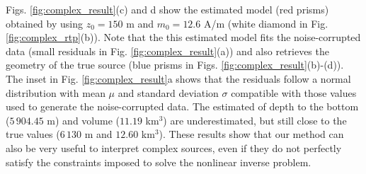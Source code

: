 Figs. \ref{fig:complex_result}(c) and d show the estimated model (red prisms) 
obtained by using $z_0 = 150$ m and $m_0 = 12.6 $ A/m 
(white diamond in Fig. \ref{fig:complex_rtp}(b)).
Note that the this estimated model fits the noise-corrupted data 
(small residuals in Fig. \ref{fig:complex_result}(a)) 
and also retrieves the geometry of the true source 
(blue prisms in Figs. \ref{fig:complex_result}(b)-(d)). 
The inset in Fig. \ref{fig:complex_result}a shows that the residuals follow a normal distribution with mean $ \mu $ and standard deviation $ \sigma $ compatible with those values used to generate the noise-corrupted data. 
The estimated of depth to the bottom ($ 5\,904.45 $ m) and volume ($ 11.19 $ km$^3 $) are underestimated, but still close to the true values ($ 6\,130 $ m and $ 12.60 $ km$^3 $). 
These results show that our method can also be very useful to interpret complex sources, even if they do not perfectly satisfy the constraints imposed to solve the nonlinear inverse problem.